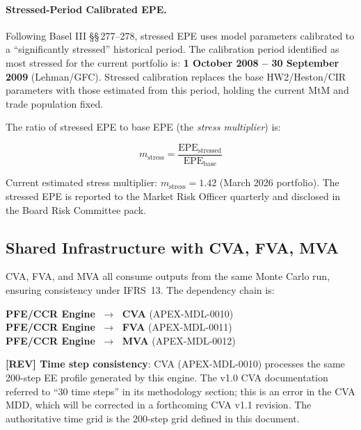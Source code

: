 \documentclass[11pt,a4paper]{article}
\begin{document}
\paragraph{Stressed-Period Calibrated EPE.}
Following Basel III \S\S\,277--278, stressed EPE uses model parameters
calibrated to a ``significantly stressed'' historical period. The calibration
period identified as most stressed for the current portfolio is:
\textbf{1 October 2008 -- 30 September 2009} (Lehman/GFC). Stressed calibration
replaces the base HW2/Heston/CIR parameters with those estimated from this
period, holding the current MtM and trade population fixed.

The ratio of stressed EPE to base EPE (the \emph{stress multiplier}) is:

\begin{equation}
  m_{\text{stress}} = \frac{\text{EPE}_{\text{stressed}}}{\text{EPE}_{\text{base}}}
  \label{eq:stress_mult}
\end{equation}

Current estimated stress multiplier: $m_{\text{stress}} = 1.42$ (March 2026
portfolio). The stressed EPE is reported to the Market Risk Officer quarterly
and disclosed in the Board Risk Committee pack.

\subsection{Shared Infrastructure with CVA, FVA, MVA}

CVA, FVA, and MVA all consume outputs from the same Monte Carlo run, ensuring
consistency under IFRS~13. The dependency chain is:

\begin{center}
  \textbf{PFE/CCR Engine} $\;\longrightarrow\;$ \textbf{CVA} (APEX-MDL-0010)\\[2pt]
  \textbf{PFE/CCR Engine} $\;\longrightarrow\;$ \textbf{FVA} (APEX-MDL-0011)\\[2pt]
  \textbf{PFE/CCR Engine} $\;\longrightarrow\;$ \textbf{MVA} (APEX-MDL-0012)
\end{center}

\textbf{[REV] Time step consistency}: CVA (APEX-MDL-0010) processes the same
200-step EE profile generated by this engine. The v1.0 CVA documentation
referred to ``30 time steps'' in its methodology section; this is an error in
the CVA MDD, which will be corrected in a forthcoming CVA v1.1 revision. The
authoritative time grid is the 200-step grid defined in this document.
\end{document}
